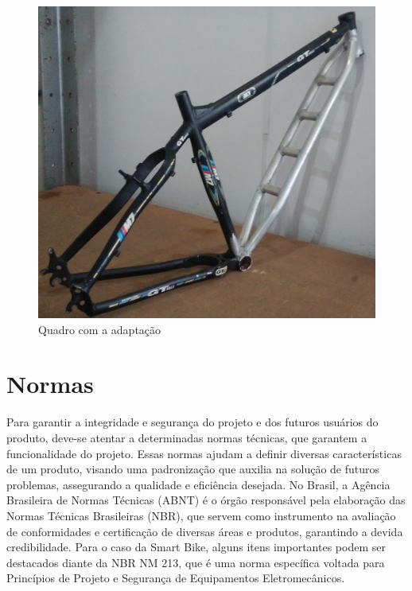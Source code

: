 	\graphicspath{{figuras/}}	
	\begin{figure}[h!]
		\centering
		\includegraphics[scale=0.15]{quadro_adap_1.jpg}
		\caption{Quadro com a adaptação}
		\label{img:quadro_adap_1}
	\end{figure}
	
	
\clearpage


  \section{Normas}
  Para garantir a integridade e segurança do projeto e dos futuros usuários do produto, deve-se atentar a determinadas normas técnicas, que garantem a funcionalidade do projeto. Essas normas ajudam a definir diversas características de um produto, visando uma padronização que auxilia na solução de futuros problemas, assegurando a qualidade e eficiência desejada. No Brasil, a Agência Brasileira de Normas Técnicas (ABNT) é o órgão responsável pela elaboração das Normas Técnicas Brasileiras (NBR), que servem como instrumento na avaliação de conformidades e certificação de diversas áreas e produtos, garantindo a devida credibilidade. Para o caso da Smart Bike, alguns itens importantes podem ser destacados diante da NBR NM 213, que é uma norma específica voltada para Princípios de Projeto e Segurança de Equipamentos Eletromecânicos.
  

